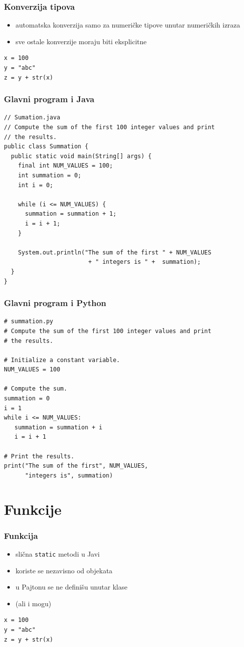 \documentclass[compress]{beamer}
\begin{document}
\begin{frame}[fragile]
\frametitle{Konverzija tipova}
\begin{itemize}
  \item automatska konverzija samo za numeričke tipove unutar numeričkih izraza
  \item sve ostale konverzije moraju biti eksplicitne
\end{itemize}
\begin{verbatim}
x = 100
y = "abc"
z = y + str(x)
\end{verbatim}
\end{frame}

\begin{frame}[fragile]
\frametitle{Glavni program i Java}
\begin{verbatim}
// Sumation.java
// Compute the sum of the first 100 integer values and print
// the results.
public class Summation {
  public static void main(String[] args) {
    final int NUM_VALUES = 100;
    int summation = 0;
    int i = 0;

    while (i <= NUM_VALUES) {
      summation = summation + 1;
      i = i + 1;
    }

    System.out.println("The sum of the first " + NUM_VALUES
                        + " integers is " +  summation);
  }
}
\end{verbatim}
\end{frame}
  
\begin{frame}[fragile]
\frametitle{Glavni program i Python}
\begin{verbatim}
# summation.py
# Compute the sum of the first 100 integer values and print
# the results.

# Initialize a constant variable.
NUM_VALUES = 100

# Compute the sum.
summation = 0
i = 1
while i <= NUM_VALUES:
   summation = summation + i
   i = i + 1

# Print the results.
print("The sum of the first", NUM_VALUES,
      "integers is", summation)
\end{verbatim}
\end{frame}
  
\section{Funkcije}

\begin{frame}[fragile]
\frametitle{Funkcija}
\begin{itemize}
  \item slična \texttt{static} metodi u Javi
  \item koriste se nezavisno od objekata
  \item u Pajtonu se ne definišu unutar klase
  \item (ali i mogu)
\end{itemize}
\begin{verbatim}
x = 100
y = "abc"
z = y + str(x)
\end{verbatim}
\end{frame}
  
\end{document}
